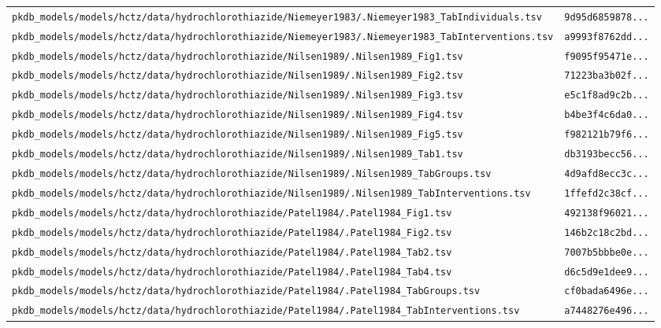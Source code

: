 \begin{longtable}{ll}
\texttt{pkdb\_models/models/hctz/data/hydrochlorothiazide/Niemeyer1983/.Niemeyer1983\_TabIndividuals.tsv} & \texttt{9d95d6859878...} \\
\texttt{pkdb\_models/models/hctz/data/hydrochlorothiazide/Niemeyer1983/.Niemeyer1983\_TabInterventions.tsv} & \texttt{a9993f8762dd...} \\
\texttt{pkdb\_models/models/hctz/data/hydrochlorothiazide/Nilsen1989/.Nilsen1989\_Fig1.tsv} & \texttt{f9095f95471e...} \\
\texttt{pkdb\_models/models/hctz/data/hydrochlorothiazide/Nilsen1989/.Nilsen1989\_Fig2.tsv} & \texttt{71223ba3b02f...} \\
\texttt{pkdb\_models/models/hctz/data/hydrochlorothiazide/Nilsen1989/.Nilsen1989\_Fig3.tsv} & \texttt{e5c1f8ad9c2b...} \\
\texttt{pkdb\_models/models/hctz/data/hydrochlorothiazide/Nilsen1989/.Nilsen1989\_Fig4.tsv} & \texttt{b4be3f4c6da0...} \\
\texttt{pkdb\_models/models/hctz/data/hydrochlorothiazide/Nilsen1989/.Nilsen1989\_Fig5.tsv} & \texttt{f982121b79f6...} \\
\texttt{pkdb\_models/models/hctz/data/hydrochlorothiazide/Nilsen1989/.Nilsen1989\_Tab1.tsv} & \texttt{db3193becc56...} \\
\texttt{pkdb\_models/models/hctz/data/hydrochlorothiazide/Nilsen1989/.Nilsen1989\_TabGroups.tsv} & \texttt{4d9afd8ecc3c...} \\
\texttt{pkdb\_models/models/hctz/data/hydrochlorothiazide/Nilsen1989/.Nilsen1989\_TabInterventions.tsv} & \texttt{1ffefd2c38cf...} \\
\texttt{pkdb\_models/models/hctz/data/hydrochlorothiazide/Patel1984/.Patel1984\_Fig1.tsv} & \texttt{492138f96021...} \\
\texttt{pkdb\_models/models/hctz/data/hydrochlorothiazide/Patel1984/.Patel1984\_Fig2.tsv} & \texttt{146b2c18c2bd...} \\
\texttt{pkdb\_models/models/hctz/data/hydrochlorothiazide/Patel1984/.Patel1984\_Tab2.tsv} & \texttt{7007b5bbbe0e...} \\
\texttt{pkdb\_models/models/hctz/data/hydrochlorothiazide/Patel1984/.Patel1984\_Tab4.tsv} & \texttt{d6c5d9e1dee9...} \\
\texttt{pkdb\_models/models/hctz/data/hydrochlorothiazide/Patel1984/.Patel1984\_TabGroups.tsv} & \texttt{cf0bada6496e...} \\
\texttt{pkdb\_models/models/hctz/data/hydrochlorothiazide/Patel1984/.Patel1984\_TabInterventions.tsv} & \texttt{a7448276e496...} \\

\end{longtable}
